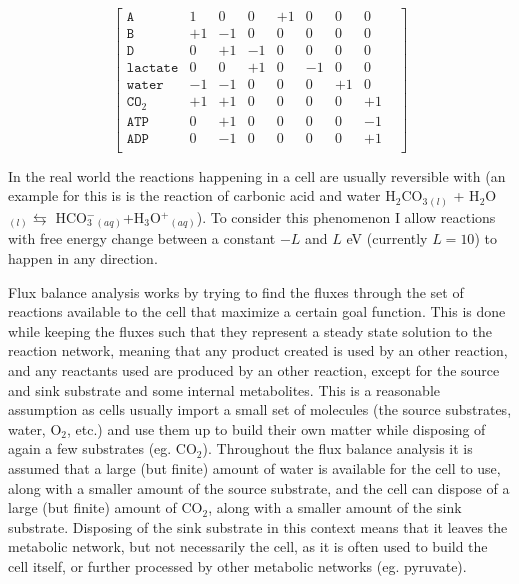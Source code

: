 \documentclass[10pt,a4paper]{article}
\begin{document}
	$$\begin{bmatrix}
			  \texttt{A} & 1 &  0 &  0 & +1 &  0 &  0 & 0 &  \\ 
			  \texttt{B} & +1 & -1 &  0 &  0 &  0 &  0 & 0 &  \\ 
			  \texttt{D} & 0 & +1 & -1 &  0 &  0 &  0 & 0 &  \\ 
			  \texttt{lactate} & 0  &  0 & +1 &  0 & -1 &  0 & 0 &  \\ 
			  \texttt{water} & -1 & -1 &  0 &  0 &  0 &+1  & 0 &  \\ 
			  \texttt{CO$_2$} & +1 & +1 &  0 &  0 &  0 &  0 & +1&  \\ 
			  \texttt{ATP} & 0 & +1 &  0 &  0 &  0 & 0 & -1 &\\ 
			  \texttt{ADP} &  0 & -1 &  0 &  0 &  0 & 0 & +1 & \\ 
			  
		\end{bmatrix} $$
	
	
	In the real world the reactions happening in a cell are usually reversible with (an example for this is is the reaction of carbonic acid and water H$_2$CO$_3$$_{(l)}$ + H$_2$O$_{(l)} \leftrightarrows$ HCO$^-_3$$_{(aq)}$+H$_3$O$^+$$_{(aq)}$). To consider this phenomenon I allow reactions with free energy change between a constant $-L$ and $L$ eV (currently $L=10$) to happen in any direction. 
	
	Flux balance analysis works by trying to find the fluxes through the set of reactions available to the cell that maximize a certain goal function. This is done while keeping the fluxes such that they represent a steady state solution to the reaction network, meaning that any product created is used by an other reaction, and any reactants used are produced by an other reaction, except for the source and sink substrate and some internal metabolites. This is a reasonable assumption as cells usually import a small set of molecules (the source substrates, water, O$_2$, etc.) and use them up to build their own matter while disposing of again a few substrates (eg. CO$_2$). Throughout the flux balance analysis it is assumed that a large (but finite) amount of water is available for the cell to use, along with a smaller amount of the source substrate, and the cell can dispose of a large (but finite) amount of CO$_2$, along with a smaller amount of the sink substrate. Disposing of the sink substrate in this context means that it leaves the metabolic network, but not necessarily the cell, as it is often used to build the cell itself, or further processed by other metabolic networks (eg. pyruvate).
	
\end{document}
